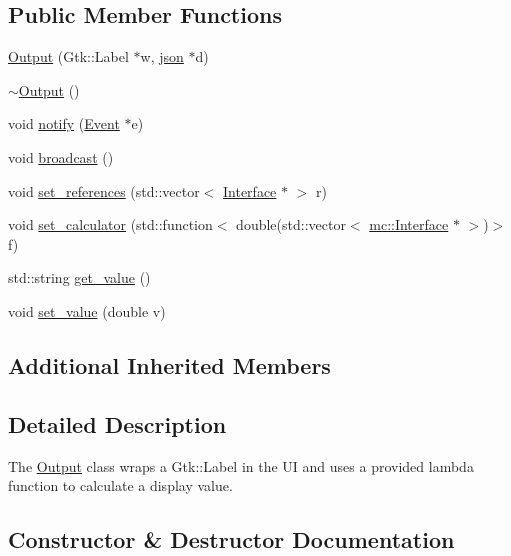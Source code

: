 \subsection*{Public Member Functions}
\begin{DoxyCompactItemize}
\item 
\hyperlink{classmc_1_1Output_a5876f782da4e0412765ec6d00acafcfc}{Output} (Gtk\+::\+Label $\ast$w, \hyperlink{application_8hpp_ab701e3ac61a85b337ec5c1abaad6742d}{json} $\ast$d)
\item 
\hyperlink{classmc_1_1Output_a008a9b63a361317f496bfc321d5f3972}{$\sim$\+Output} ()
\item 
void \hyperlink{classmc_1_1Output_ac743a7671116432ddaf910e1ffb8eaa2}{notify} (\hyperlink{classmc_1_1Event}{Event} $\ast$e)
\item 
void \hyperlink{classmc_1_1Output_a4551a309472c048d9c5c14786cc623a1}{broadcast} ()
\item 
void \hyperlink{classmc_1_1Output_a6d84487fd991c839954d8458862d1aab}{set\+\_\+references} (std\+::vector$<$ \hyperlink{classmc_1_1Interface}{Interface} $\ast$ $>$ r)
\item 
void \hyperlink{classmc_1_1Output_a6953830b79ed5b8360b0fd4e0af50f19}{set\+\_\+calculator} (std\+::function$<$ double(std\+::vector$<$ \hyperlink{classmc_1_1Interface}{mc\+::\+Interface} $\ast$ $>$)$>$ f)
\item 
std\+::string \hyperlink{classmc_1_1Output_ab4ee892d21cd77e44f8c492e8ac62e99}{get\+\_\+value} ()
\item 
void \hyperlink{classmc_1_1Output_a49c49122555095cc88668a8af1aac944}{set\+\_\+value} (double v)
\end{DoxyCompactItemize}
\subsection*{Additional Inherited Members}


\subsection{Detailed Description}
The \hyperlink{classmc_1_1Output}{Output} class wraps a Gtk\+::\+Label in the UI and uses a provided lambda function to calculate a display value. 

\subsection{Constructor \& Destructor Documentation}
